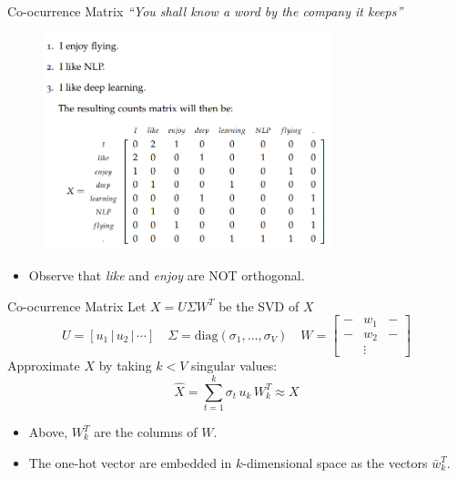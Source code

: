 \documentclass[9pt]{beamer}
\newcommand{\given}{\, | \,}
\newcommand{\diag}{\text{diag}}
\begin{document}
\begin{frame}{Co-ocurrence Matrix}
    \textit{``You shall know a word by the company it keeps''}\\[4mm]
    \hspace*{}
    \begin{figure}[c]
    \includegraphics[width=0.75\textwidth]{coocurrence_matrix.png}
    \end{figure}
    \begin{itemize}
        \item Observe that \textit{like} and \textit{enjoy} are NOT orthogonal.
    \end{itemize}
\end{frame}

\begin{frame}{Co-ocurrence Matrix}
Let $X = U\Sigma W^T$ be the SVD of $X$
    $$ U = [u_1 \given u_2\given \cdots ]\quad \Sigma = \diag(\sigma_1,\ldots, \sigma_V)\quad W = \begin{bmatrix}-& w_1&- \\-& w_2&- \\ &\vdots& \end{bmatrix}$$
        Approximate $X$ by taking $k<V$ singular values:
        $$\hat X = \sum_{t=1}^k \sigma_t\, u_k\, W_k^T\approx X$$
        \begin{itemize}
                \item Above, $W_k^T$ are the columns of $W$.
        \item The one-hot vector are embedded in $k$-dimensional space as the vectors $\bar w_k^T$.
        \end{itemize}
\end{frame}
\end{document}

